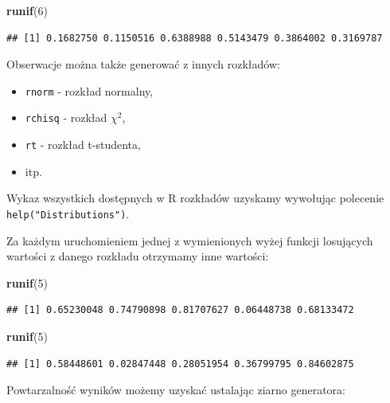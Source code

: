 \documentclass[]{book}
\newenvironment{Shaded}{\begin{snugshade}}{\end{snugshade}}
\newcommand{\KeywordTok}[1]{\textcolor[rgb]{0.13,0.29,0.53}{\textbf{#1}}}
\newcommand{\DecValTok}[1]{\textcolor[rgb]{0.00,0.00,0.81}{#1}}
\newcommand{\NormalTok}[1]{#1}
\providecommand{\tightlist}{%
  \setlength{\itemsep}{0pt}\setlength{\parskip}{0pt}}
\begin{document}
\begin{Shaded}
\begin{Highlighting}[]
\KeywordTok{runif}\NormalTok{(}\DecValTok{6}\NormalTok{)}
\end{Highlighting}
\end{Shaded}

\begin{verbatim}
## [1] 0.1682750 0.1150516 0.6388988 0.5143479 0.3864002 0.3169787
\end{verbatim}

Obserwacje można także generować z innych rozkładów:

\begin{itemize}
\tightlist
\item
  \texttt{rnorm} - rozkład normalny,
\item
  \texttt{rchisq} - rozkład \(\chi^2\),
\item
  \texttt{rt} - rozkład t-studenta,
\item
  itp.
\end{itemize}

Wykaz wszystkich dostępnych w R rozkładów uzyskamy wywołując polecenie
\texttt{help("Distributions")}.

Za każdym uruchomieniem jednej z wymienionych wyżej funkcji losujących
wartości z danego rozkładu otrzymamy inne wartości:

\begin{Shaded}
\begin{Highlighting}[]
\KeywordTok{runif}\NormalTok{(}\DecValTok{5}\NormalTok{)}
\end{Highlighting}
\end{Shaded}

\begin{verbatim}
## [1] 0.65230048 0.74790898 0.81707627 0.06448738 0.68133472
\end{verbatim}

\begin{Shaded}
\begin{Highlighting}[]
\KeywordTok{runif}\NormalTok{(}\DecValTok{5}\NormalTok{)}
\end{Highlighting}
\end{Shaded}

\begin{verbatim}
## [1] 0.58448601 0.02847448 0.28051954 0.36799795 0.84602875
\end{verbatim}

Powtarzalność wyników możemy uzyskać ustalając ziarno generatora:
\end{document}
